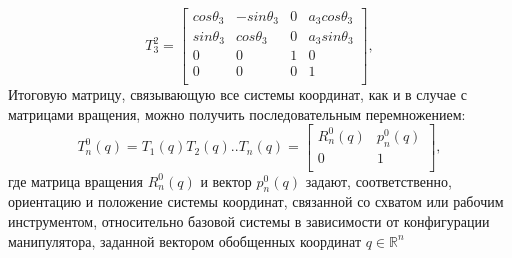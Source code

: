 \begin{equation*}\label{eq:model}
T_3^2 = 
      \begin{bmatrix}
    cos{\theta_3 } & -sin{\theta_3} & 0 & a_3 cos{\theta_3} \\
    sin{\theta_3} & cos{\theta_3} & 0 & a_3 sin{\theta_3}\\
    0 & 0 & 1 & 0\\
    0 & 0 & 0 & 1\\
    \end{bmatrix}
    ,
\end{equation*}  
\hspace*{\parindent}Итоговую матрицу, связывающую все системы координат, как и в случае с матрицами вращения, можно получить последовательным перемножением:\\

\begin{equation*}\label{eq:model}
T_n^0(q) = T_1(q)T_2(q)..T_n(q) = 
     \begin{bmatrix}
    R_n^0(q) & p_n^0(q)\\
    0 & 1\\
    \end{bmatrix}
    ,
\end{equation*} 
\hspace*{\parindent}где матрица вращения  $R_n^0(q)$ и вектор $p_n^0(q)$ задают, соответственно, ориентацию и положение системы координат, связанной со схватом или рабочим инструментом, относительно базовой системы в зависимости от конфигурации манипулятора, заданной вектором обобщенных координат $q \in \mathbb {R}^n$